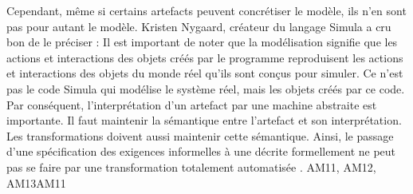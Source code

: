{Cependant, même si certains artefacts peuvent concrétiser le modèle, ils n'en sont pas pour autant le modèle. Kristen Nygaard, créateur du langage Simula a cru bon de le préciser : 
 {Il est important de noter que la modélisation signifie que les actions et interactions des objets créés par le programme reproduisent les actions et interactions des objets du monde réel qu'ils sont conçus pour simuler. Ce n'est pas le code Simula qui modélise le système réel, mais les objets créés par ce code.} {\cite{black_object_2013}}
Par conséquent, l'interprétation d'un artefact par une machine abstraite est importante. Il faut maintenir la sémantique entre l'artefact et son interprétation. Les transformations doivent aussi maintenir cette sémantique. Ainsi, le passage d'une spécification des exigences informelles à une décrite formellement ne peut pas se faire par une transformation totalement automatisée \cite{lamsweerde_formal_2000}.
}{AM11, AM12, AM13}{AM11}

